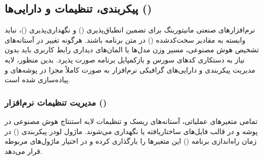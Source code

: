 \documentclass[a4paper, 10pt, twocolumn]{article}
\begin{document}
	\begin{table}[htbp]
		\centering
		\caption{تفکیک نخ‌ها (Threads) و سیگنال‌های ارتباطی در معماری رابط کاربری PyQt}
		\label{tab:pyqt_threads}
	\end{table}
	
	\subsection{پیکربندی، تنظیمات و دارایی‌ها ()}
	
	نرم‌افزارهای صنعتی مانیتورینگ برای تضمین انطباق‌پذیری () و نگهداری‌پذیری ()، نباید وابسته به مقادیر سخت‌کدشده () در متن برنامه باشند. هرگونه تغییر در آستانه‌های تشخیص هوش مصنوعی، مسیر وزن مدل‌ها یا المان‌های دیداری رابط کاربری باید بدون نیاز به دستکاری کدهای سورس و بازکمپایل برنامه صورت پذیرد. بدین منظور، لایه مدیریت پیکربندی و دارایی‌های گرافیکی نرم‌افزار به صورت کاملاً مجزا در پوشه‌های  و  پیاده‌سازی شده است.
	
	\subsubsection{مدیریت تنظیمات نرم‌افزار ()}
	تمامی متغیرهای عملیاتی، آستانه‌های ریسک و تنظیمات لایه استنتاج هوش مصنوعی در پوشه  و در قالب فایل‌های ساختاریافته  یا  نگهداری می‌شوند. ماژول لودر پیکربندی () در زمان راه‌اندازی برنامه () این متغیرها را بارگذاری کرده و در اختیار ماژول‌های مربوطه قرار می‌دهد.
	
\end{document}
